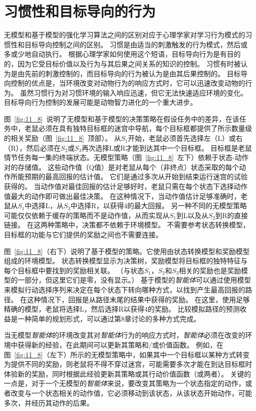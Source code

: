 \section{习惯性和目标导向的行为} \label{sec:habitual_behavior}

无模型和基于模型的强化学习算法之间的区别对应于心理学家对学习行为模式的习惯性和目标导向控制之间的区别。
习惯是由适当的刺激触发的行为模式，然后或多或少地自动执行。
根据心理学家如何使用这个短语，目标导向行为是有目的的，因为它受目标价值以及行为与其后果之间关系的知识的控制。
习惯有时被认为是由先前的刺激控制的，而目标导向的行为被认为是由其后果控制的\cite{dickinson1980contemporary,dickinson1985actions}。
目标导向控制的优点是，当环境改变对动物行为的响应方式时，它可以迅速改变动物的行为。
虽然习惯行为对习惯环境的输入响应迅速，但它无法快速适应环境的变化。
目标导向行为控制的发展可能是动物智力进化的一个重大进步。


图~\ref{fig:11_8}~说明了无模型和基于模型的决策策略在假设任务中的差异，在该任务中，老鼠必须在具有独特目标框的迷宫中导航，每个目标框都提供了所示数量级的相关奖励（图~\ref{fig:11_8}~顶部）。
从$ S_1 $开始，老鼠必须首先选择左（L）或右（R），然后必须在$ S_2 $或$ S_3 $再次选择L或R才能到达其中一个目标框。
目标框是老鼠情节任务每一集的终端状态。无模型策略（图~\ref{fig:11_8}~左下）依赖于状态-动作对的存储值。
这些动作值（Q值）是对老鼠从每个（非终点）状态采取的每个动作所能预期的最高回报的估计值。
它们是通过多次从开始到结束运行迷宫的试验获得的。
当动作值对最佳回报的估计足够好时，老鼠只需在每个状态下选择动作值最大的动作即可做出最佳决策。
在这种情况下，当动作值估计足够准确时，老鼠从$ S_1 $中选择L，从$ S_2 $中选择R，以获得4的最大回报。
另一种不同的无模型策略可能仅仅依赖于缓存的策略而不是动作值，从而实现从$ S_1 $到L以及从$ S_2 $到R的直接链接。
在这两种策略中，决策都不依赖于环境模型。
不需要参考状态转换模型，目标框的功能与它们提供的奖励之间也不需要连接。


图~\ref{fig:11_8}（右下）说明了基于模型的策略。它使用由状态转换模型和奖励模型组成的环境模型。
状态转换模型显示为决策树，奖励模型将目标框的独特特征与每个目标框中要找到的奖励相关联。
（与状态$ S_1 $，$ S_2 $和$ S_3 $相关的奖励也是奖励模型的一部分，但这里它们是零，没有显示。）
基于模型的\textit{智能体}可以通过使用模型来模拟行动选择序列来决定在每个状态下转向哪种方式，以找到产生最高回报的路径。
在这种情况下，回报是从路径末尾的结果中获得的奖励。
在这里，使用足够精确的模型，老鼠将选择L，然后选择R以获得4的奖励。
比较模拟路径的预测收益是一种简单的规划形式，可以通过第8章讨论的多种方式完成。


当无模型\textit{智能体}的环境改变其对\textit{智能体}行为的响应方式时，\textit{智能体}必须在改变的环境中获得新的经验，在此期间可以更新其策略和/或价值函数。
例如，在图~\ref{fig:11_8}（左下）所示的无模型策略中，如果其中一个目标框以某种方式转变为提供不同的奖励，则老鼠将不得不穿过迷宫，可能需要多次才能在到达目标框时体验新的奖励，同时根据此经验更新其策略或其行动价值函数（或两者）。
关键的一点是，对于一个无模型的\textit{智能体}来说，要改变其策略为一个状态指定的动作，或者改变与一个状态相关的动作值，它必须移动到该状态，从该状态开始动作，可能多次，并经历其动作的后果。


